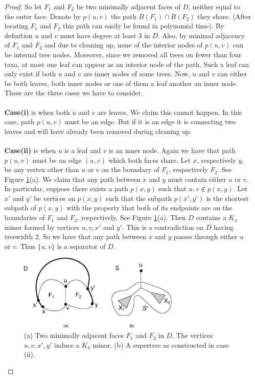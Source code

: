 \begin{proof}
So let $F_1$ and $F_2$ be two minimally adjacent faces of $D$, neither equal to the outer face. Denote by $p(u,v)$ the path $B(F_1) \cap B(F_2)$ they share. (After locating $F_1$ and $F_2$ this path can easily be found in polynomial time). By definition $u$ and $v$ must have degree at least 3 in $D$. Also, by minimal adjacency of $F_1$ and $F_2$ and due to cleaning up, none of the interior nodes of $p(u,v)$ can be internal tree nodes. Moreover, since we removed all trees on fewer than four taxa, at most one leaf can appear as an interior node of the path. Such a leaf can only exist if both $u$ and $v$ are inner nodes of some trees. Now, $u$ and $v$ can either be both leaves, both inner nodes or one of them a leaf another an inner node. These are the three cases we have to consider.\\
\\
\textbf{Case(i)} is when both $u$ and $v$ are leaves. We claim this cannot happen. In this case, path $p(u,v)$ must be an edge. But if it is an edge it is connecting two leaves and will have already been removed during cleaning up.\\
\\
\textbf{Case(ii)} is when $u$ is a leaf and $v$ is an inner node. Again we have that path $p(u,v)$ must be an edge $(u,v)$ which both faces share. Let $x$, respectively $y$, be any vertex other than $u$ or $v$ on the boundary of $F_1$, respectively $F_2$. See Figure \ref{fig:K4separator}(a). We claim that any path between $x$ and $y$ must contain either $u$ or $v$. In particular, suppose there exists a path $p(x,y)$ such that $u,v \notin p(x,y)$. Let $x'$ and $y'$ be vertices on $p(x,y)$ such that the subpath $p(x',y')$ is the shortest subpath of $p(x,y)$ with the property that both of its endpoints are on the boundaries of $F_1$ and $F_2$, respectively. See Figure \ref{fig:K4separator}(a). Then $D$ contains a $K_4$ minor formed by vertices $u, v, x'$ and $y'$. %
This is a contradiction on $D$ having treewidth 2. So we have that any path between $x$ and $y$ passes through either $u$ or $v$. Thus $\{u,v\}$ is a separator of $D$. 

\begin{figure}[h]
 \begin{center}
  \includegraphics[width=8cm]{../figs/ch5/K4separator.pdf}
 \end{center} 
 \caption{(a) Two minimally adjacent faces $F_1$ and $F_2$ in $D$. The vertices $u,v,x',y'$ induce a $K_4$ minor. (b) A supertree as constructed in case (ii).}
 \label{fig:K4separator}
\end{figure}


\end{proof}
